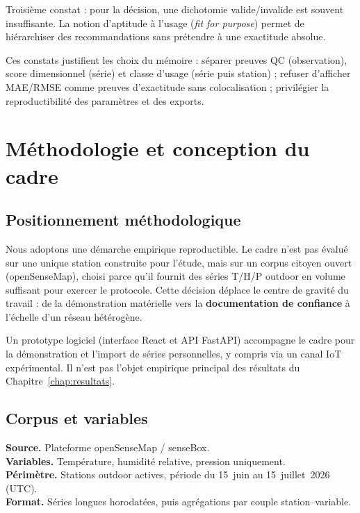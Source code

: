 \documentclass[12pt,a4paper]{report}
\begin{document}
Troisième constat : pour la décision, une dichotomie valide/invalide est
souvent insuffisante. La notion d'aptitude à l'usage (\textit{fit for purpose})
permet de hiérarchiser des recommandations sans prétendre à une exactitude
absolue.

Ces constats justifient les choix du mémoire : séparer preuves QC (observation),
score dimensionnel (série) et classe d'usage (série puis station) ; refuser
d'afficher MAE/RMSE comme preuves d'exactitude sans colocalisation ; privilégier
la reproductibilité des paramètres et des exports.

\chapter{Méthodologie et conception du cadre}
\label{chap:methodo}

\section{Positionnement méthodologique}

Nous adoptons une démarche empirique reproductible. Le cadre n'est pas évalué
sur une unique station construite pour l'étude, mais sur un corpus citoyen
ouvert (openSenseMap), choisi parce qu'il fournit des séries T/H/P outdoor en
volume suffisant pour exercer le protocole. Cette décision déplace le centre de
gravité du travail : de la démonstration matérielle vers la
\textbf{documentation de confiance} à l'échelle d'un réseau hétérogène.

Un prototype logiciel (interface React et API FastAPI) accompagne le cadre pour
la démonstration et l'import de séries personnelles, y compris via un canal IoT
expérimental. Il n'est pas l'objet empirique principal des résultats du
Chapitre~\ref{chap:resultats}.

\section{Corpus et variables}

\textbf{Source.} Plateforme openSenseMap / senseBox.\\
\textbf{Variables.} Température, humidité relative, pression uniquement.\\
\textbf{Périmètre.} Stations outdoor actives, période du 15~juin au
15~juillet~2026 (UTC).\\
\textbf{Format.} Séries longues horodatées, puis agrégations par couple
station--variable.
\end{document}

